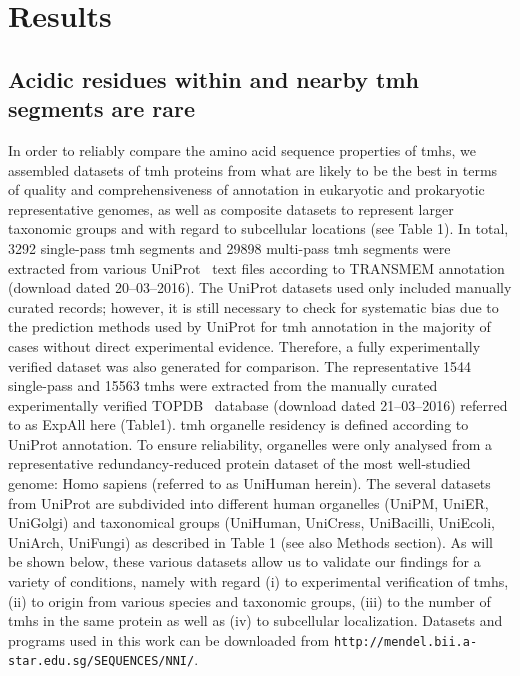 \section{Results}

\subsection{Acidic residues within and nearby \gls{tmh} segments are rare}

In order to reliably compare the amino acid sequence properties of \gls{tmh}s, we assembled datasets of \gls{tmh} proteins from what are likely to be the best in terms of quality and comprehensiveness of annotation in eukaryotic and prokaryotic representative genomes, as well as composite datasets to represent larger taxonomic groups and with regard to subcellular locations (see Table 1). In total, 3292 single-pass \gls{tmh} segments and 29898 multi-pass \gls{tmh} segments were extracted from various UniProt~\cite{TheUniProtConsortium2014} text files according to TRANSMEM annotation (download dated 20--03--2016). The UniProt datasets used only included manually curated records; however, it is still necessary to check for systematic bias due to the prediction methods used by UniProt for \gls{tmh} annotation in the majority of cases without direct experimental evidence. Therefore, a fully experimentally verified dataset was also generated for comparison. The representative 1544 single-pass and 15563 \gls{tmh}s were extracted from the manually curated experimentally verified TOPDB~\cite{Dobson2015} database (download dated 21--03--2016) referred to as ExpAll here (Table1). \gls{tmh} organelle residency is defined according to UniProt annotation. To ensure reliability, organelles were only analysed from a representative redundancy-reduced protein dataset of the most well-studied genome: Homo sapiens (referred to as UniHuman herein). The several datasets from UniProt  are subdivided into different human organelles (UniPM, UniER, UniGolgi) and taxonomical groups (UniHuman, UniCress, UniBacilli, UniEcoli, UniArch, UniFungi) as described in Table 1 (see also Methods section). As will be shown below, these various datasets allow us to validate our findings for a variety of conditions, namely with regard (i) to experimental verification of \gls{tmh}s, (ii) to origin from various species and taxonomic groups, (iii) to the number of \gls{tmh}s in the same protein as well as (iv) to subcellular localization. Datasets and programs used in this work can be downloaded from \texttt{http://mendel.bii.a-star.edu.sg/SEQUENCES/NNI/}.


